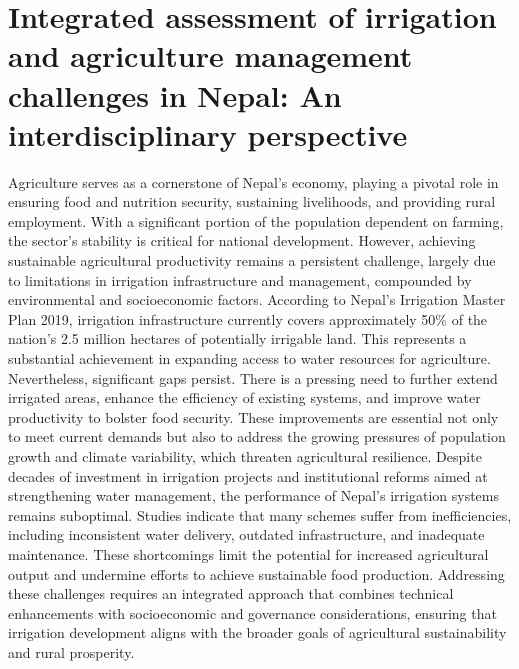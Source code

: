 \documentclass[a4paper,12pt]{article}
\begin{document}
\section{Integrated assessment of irrigation and agriculture management challenges in Nepal: An interdisciplinary perspective}
\parencite{nepalIntegratedAssessmentIrrigation2024}
Agriculture serves as a cornerstone of Nepal’s economy, playing a pivotal role in ensuring food and nutrition security, sustaining livelihoods, and providing rural employment. With a significant portion of the population dependent on farming, the sector’s stability is critical for national development. However, achieving sustainable agricultural productivity remains a persistent challenge, largely due to limitations in irrigation infrastructure and management, compounded by environmental and socioeconomic factors.
According to Nepal’s Irrigation Master Plan 2019, irrigation infrastructure currently covers approximately 50\% of the nation’s 2.5 million hectares of potentially irrigable land. This represents a substantial achievement in expanding access to water resources for agriculture. Nevertheless, significant gaps persist. There is a pressing need to further extend irrigated areas, enhance the efficiency of existing systems, and improve water productivity to bolster food security. These improvements are essential not only to meet current demands but also to address the growing pressures of population growth and climate variability, which threaten agricultural resilience.
Despite decades of investment in irrigation projects and institutional reforms aimed at strengthening water management, the performance of Nepal’s irrigation systems remains suboptimal. Studies indicate that many schemes suffer from inefficiencies, including inconsistent water delivery, outdated infrastructure, and inadequate maintenance. These shortcomings limit the potential for increased agricultural output and undermine efforts to achieve sustainable food production. Addressing these challenges requires an integrated approach that combines technical enhancements with socioeconomic and governance considerations, ensuring that irrigation development aligns with the broader goals of agricultural sustainability and rural prosperity.
\end{document}

